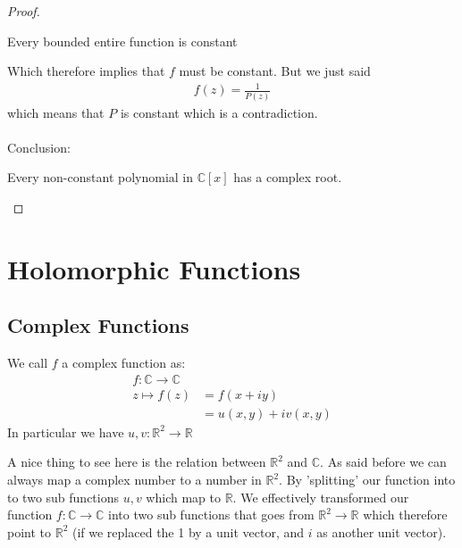 \begin{proof}
\begin{theoreme}
		Every bounded entire function is constant
	\end{theoreme}
	Which therefore implies that $f$ must be constant. But we just said
	\begin{align*} 
		f\left(z\right) = \frac{1}{P\left(z\right)}
	\end{align*}
	which means that $P$ is constant which is a contradiction.\\
	$ $\\
	Conclusion:
	\begin{center}
		Every non-constant polynomial in $\mathbb{C}\left[x\right]$ has a complex root.
	\end{center}
\end{proof}



\chapter{Holomorphic Functions}
\section{Complex Functions}

\begin{definition}
	We call $f$ a complex function as:
	\begin{align*} 
		f : \mathbb{C} \to \mathbb{C} \\
		z \mapsto f(z) &= f(x + iy)\\
					   &= u(x, y) + iv\left(x, y\right)
	\end{align*}
	In particular we have $u, v : \mathbb{R}^2 \to \mathbb{R}$
\end{definition}
A nice thing to see here is the relation between $\mathbb{R}^2$ and $\mathbb{C}$. As said before we can always map a complex number to a number in $ \mathbb{R}^2$. By 'splitting' our function into to  two sub functions $u, v$ which map to $ \mathbb{R}$. We effectively transformed our function $f : \mathbb{C} \to \mathbb{C}$ into two sub functions that goes from $ \mathbb{R}^2 \to \mathbb{R}$ which therefore point to $ \mathbb{R}^2$ (if we replaced the 1 by a unit vector, and $i$ as another unit vector).


